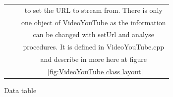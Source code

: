 \documentclass{article}
\begin{document}
\begin{figure}[H]
\begin{center}
\begin{tabular} { | c | c | c |}
                                             &&to set the URL to stream from. There is only   \\
                                             &&one object of VideoYouTube as the information  \\
                                             &&can be changed with setUrl and analyse         \\
                                             &&procedures. It is defined in VideoYouTube.cpp  \\
                                             &&and describe in more here at figure            \\
                                             &&~\ref{fig:VideoYouTube class layout}           \\ \hline
        \end{tabular}
    \end{center}
    \caption{Data table} \label{fig:dataTable}
\end{figure}
\newpage
\end{document}
